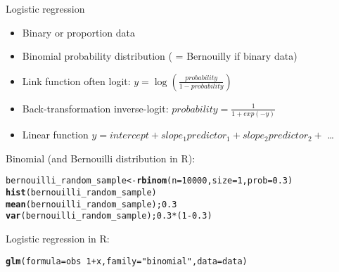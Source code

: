 \documentclass[10pt]{beamer}\usepackage[]{graphicx}\usepackage[]{color}
\makeatletter
\newcommand{\hlnum}[1]{\textcolor[rgb]{0.686,0.059,0.569}{#1}}%
\newcommand{\hlstr}[1]{\textcolor[rgb]{0.192,0.494,0.8}{#1}}%
\newcommand{\hlopt}[1]{\textcolor[rgb]{0,0,0}{#1}}%
\newcommand{\hlstd}[1]{\textcolor[rgb]{0.345,0.345,0.345}{#1}}%
\newcommand{\hlkwb}[1]{\textcolor[rgb]{0.69,0.353,0.396}{#1}}%
\newcommand{\hlkwc}[1]{\textcolor[rgb]{0.333,0.667,0.333}{#1}}%
\newcommand{\hlkwd}[1]{\textcolor[rgb]{0.737,0.353,0.396}{\textbf{#1}}}%
\newenvironment{kframe}{%
 \def\at@end@of@kframe{}%
 \ifinner\ifhmode%
  \def\at@end@of@kframe{\end{minipage}}%
  \begin{minipage}{\columnwidth}%
 \fi\fi%
 \def\FrameCommand##1{\hskip\@totalleftmargin \hskip-\fboxsep
 \colorbox{shadecolor}{##1}\hskip-\fboxsep
     \hskip-\linewidth \hskip-\@totalleftmargin \hskip\columnwidth}%
 \MakeFramed {\advance\hsize-\width
   \@totalleftmargin\z@ \linewidth\hsize
   \@setminipage}}%
 {\par\unskip\endMakeFramed%
 \at@end@of@kframe}
\newenvironment{knitrout}{}{} %
\makeatother
\begin{document}
\begin{frame}[fragile]{Logistic regression}
  \begin{itemize}[<+->]
    \item Binary or proportion data
    \item Binomial probability distribution ( = Bernouilly if binary data)
    \item Link function often logit: $y=\log(\frac{probability}{1-probability})$
    \item Back-transformation inverse-logit: $probability = \frac{1}{1 + exp(-y)}$
    \item Linear function $y = intercept + slope_1 predictor_1 + slope_2 predictor_2 +$ \dots
  \end{itemize}

  Binomial (and Bernouilli distribution in R):
\begin{knitrout}\small
{}\color{fgcolor}\begin{kframe}
\begin{alltt}
  \hlstd{bernouilli_random_sample} \hlkwb{<-} \hlkwd{rbinom}\hlstd{(}\hlkwc{n} \hlstd{=} \hlnum{10000}\hlstd{,} \hlkwc{size} \hlstd{=} \hlnum{1}\hlstd{,} \hlkwc{prob} \hlstd{=} \hlnum{0.3}\hlstd{)}
  \hlkwd{hist}\hlstd{(bernouilli_random_sample)}
  \hlkwd{mean}\hlstd{(bernouilli_random_sample);} \hlnum{0.3}
  \hlkwd{var}\hlstd{(bernouilli_random_sample);} \hlnum{0.3}\hlopt{*}\hlstd{(}\hlnum{1}\hlopt{-}\hlnum{0.3}\hlstd{)}
\end{alltt}
\end{kframe}
\end{knitrout}
  
  Logistic regression in R:
\begin{knitrout}\small
{}\color{fgcolor}\begin{kframe}
\begin{alltt}
  \hlkwd{glm}\hlstd{(}\hlkwc{formula} \hlstd{= obs} \hlopt{~} \hlnum{1} \hlopt{+} \hlstd{x,} \hlkwc{family} \hlstd{=} \hlstr{"binomial"}\hlstd{,} \hlkwc{data}\hlstd{=data)}
\end{alltt}
\end{kframe}
\end{knitrout}
  
\end{frame}
\end{document}
